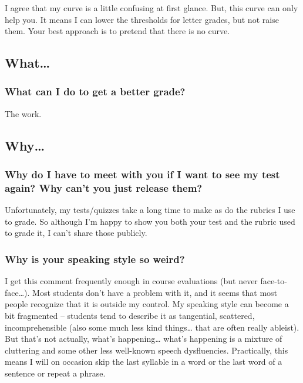 \documentclass[
]{book}
\begin{document}
I agree that my curve is a little confusing at first glance.
But, this curve can only help you. It means I can lower the thresholds for letter grades, but not raise them.
Your best approach is to pretend that there is no curve.

\hypertarget{what}{%
\subsection{What\ldots{}}\label{what}}

\hypertarget{what-can-i-do-to-get-a-better-grade}{%
\subsubsection{What can I do to get a better grade?}\label{what-can-i-do-to-get-a-better-grade}}

The work.

\hypertarget{why}{%
\subsection{Why\ldots{}}\label{why}}

\hypertarget{why-do-i-have-to-meet-with-you-if-i-want-to-see-my-test-again-why-cant-you-just-release-them}{%
\subsubsection{Why do I have to meet with you if I want to see my test again? Why can't you just release them?}\label{why-do-i-have-to-meet-with-you-if-i-want-to-see-my-test-again-why-cant-you-just-release-them}}

Unfortunately, my tests/quizzes take a long time to make as do the rubrics I use to grade. So although I'm happy to show you both your test and the rubric used to grade it, I can't share those publicly.

\hypertarget{why-is-your-speaking-style-so-weird}{%
\subsubsection{Why is your speaking style so weird?}\label{why-is-your-speaking-style-so-weird}}

I get this comment frequently enough in course evaluations (but never face-to-face\ldots). Most students don't have a problem with it, and it seems that most people recognize that it is outside my control. My speaking style can become a bit fragmented -- students tend to describe it as tangential, scattered, incomprehensible (also some much less kind things\ldots{} that are often really ableist). But that's not actually, what's happening\ldots{} what's happening is a mixture of cluttering and some other less well-known speech dysfluencies. Practically, this means I will on occasion skip the last syllable in a word or the last word of a sentence or repeat a phrase.
\end{document}
